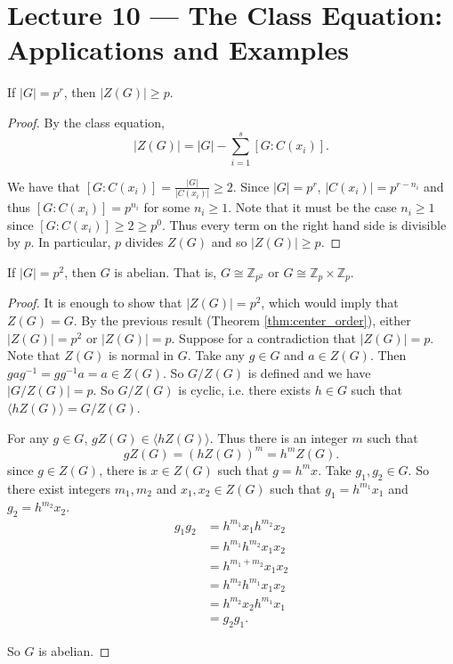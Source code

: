 \section{Lecture 10 — The Class Equation: Applications and Examples}

\begin{theorem}\label{thm:center_order}
	If $|G|=p^r$, then $|Z(G)|\geq p$.
\end{theorem}

\begin{proof}
	By the class equation,
	$$|Z(G)|=|G|-\sum_{i=1}^s[G:C(x_i)].$$

	We have that $[G:C(x_i)]=\frac{|G|}{|C(x_i)|}\geq 2$. Since $|G|=p^r$, $|C(x_i)|=p^{r-n_i}$ and thus $[G:C(x_i)]=p^{n_i}$ for some $n_i\geq 1$. Note that it must be the case $n_i\geq 1$ since $[G:C(x_i)]\geq 2\geq p^0$. Thus every term on the right hand side is divisible by $p$. In particular, $p$ divides $Z(G)$ and so $|Z(G)|\geq p$.
\end{proof}

\begin{theorem}
	If $|G|=p^2$, then $G$ is abelian. That is, $G\cong\mathbb Z_{p^2}$ or $G\cong\mathbb Z_p\times\mathbb Z_p$.
\end{theorem}

\begin{proof}
	It is enough to show that $|Z(G)|=p^2$, which would imply that $Z(G)=G$. By the previous result (Theorem \ref{thm:center_order}), either $|Z(G)|=p^2$ or $|Z(G)|=p$. Suppose for a contradiction that $|Z(G)|=p$. Note that $Z(G)$ is normal in $G$. Take any $g\in G$ and $a\in Z(G)$. Then $gag^{-1}=gg^{-1}a=a\in Z(G)$. So $G/Z(G)$ is defined and we have $|G/Z(G)|=p$. So $G/Z(G)$ is cyclic, i.e. there exists $h\in G$ such that $\langle hZ(G)\rangle =G/Z(G)$.

	For any $g\in G$, $gZ(G)\in\langle hZ(G)\rangle$. Thus there is an integer $m$ such that
	$$gZ(G)=(hZ(G))^m=h^mZ(G).$$
	since $g\in Z(G)$, there is $x\in Z(G)$ such that $g=h^mx$. Take $g_1,g_2\in G$. So there exist integers $m_1, m_2$ and $x_1,x_2\in Z(G)$ such that $g_1=h^{m_1}x_1$ and $g_2=h^{m_2}x_2$.
	\begin{align*}
		g_1g_2&=h^{m_1}x_1h^{m_2}x_2\\
		&=h^{m_1}h^{m_2}x_1x_2\\
		&=h^{m_1+m_2}x_1x_2\\
		&=h^{m_2}h^{m_1}x_1x_2\\
		&=h^{m_2}x_2h^{m_1}x_1\\
		&=g_2g_1.
	\end{align*}

	So $G$ is abelian.
\end{proof}

